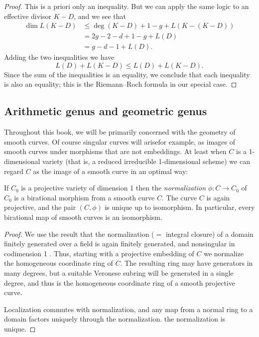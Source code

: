 \begin{proof}
This is a priori only an inequality. But we can apply the same logic to an effective divisor $K-D$, and we see that
\begin{align*}
\dim L(K-D) &\leq \deg(K-D) + 1 - g + L(K - (K-D)) \\
& = 2g - 2 - d + 1 - g  + L(D) \\
&= g - d - 1 + L(D).
\end{align*}
Adding the two inequalities we have
$$
L(D) + L(K-D) \leq L(D) + L(K-D).
$$
Since the sum of the inequalities is an equality, we conclude that each inequality is also an equality; this is the Riemann--Roch formula
in our special case.
\end{proof}

\subsection*{Arithmetic genus and geometric genus}

Throughout this book, we will be primarily concerned with the geometry of smooth curves. Of course singular curves will arise\emdash for example, as images of smooth curves under morphisms that are not embeddings. At least when $C$ is a 1-dimensional variety (that is, a 
reduced irreducible 1-dimensional scheme) we can  regard $C$ as the image of a smooth curve in an optimal way:

\begin{proposition}\label{resolution of singularities}
If $C_0$ is a projective variety of dimension 1 then the \emph{normalization} $\phi: C \to C_0$ of $C_0$ is a birational
morphism from a smooth curve $C$. The curve $C$ is again projective, and the pair $(C, \phi)$ is
unique up to  isomorphism. In particular, every birational map of smooth curves is an isomorphism.
\end{proposition}
 
\begin{proof}
  We use the result that the normalization ($=$ integral closure) of a domain
finitely generated over a field is again finitely generated, and nonsingular in codimension 1 \cite[Theorem 4.14 and 11.5]{Eisenbud1995}. Thus,
starting with a projective embedding of $C$ we normalize the homogeneous coordinate ring of $C$. The resulting ring
may have generators in many degrees, but a suitable Veronese subring will be generated in a single degree, and thus
is the homogeneous coordinate ring of a smooth projective curve. 

Localization
commutes with normalization, and any map from a normal ring to a
domain factors uniquely through the normalization. 
the normalization is unique.
\end{proof}

